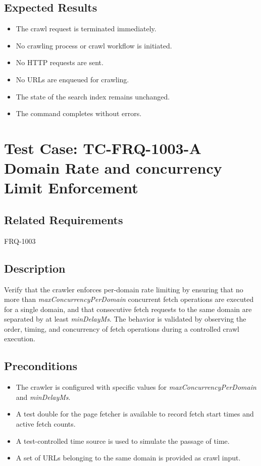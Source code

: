 \documentclass{article}
\begin{document}
\subsection*{Expected Results}
\begin{itemize}
  \item The crawl request is terminated immediately.
  \item No crawling process or crawl workflow is initiated.
  \item No HTTP requests are sent.
  \item No URLs are enqueued for crawling.
  \item The state of the search index remains unchanged.
  \item The command completes without errors.
\end{itemize}


\section{Test Case: TC-FRQ-1003-A \newline Domain Rate and concurrency Limit Enforcement}

\subsection*{Related Requirements}
FRQ-1003

\subsection*{Description}
Verify that the crawler enforces per-domain rate limiting by ensuring that no more than 
\textit{maxConcurrencyPerDomain} concurrent fetch operations are executed for a single domain, 
and that consecutive fetch requests to the same domain are separated by at least 
\textit{minDelayMs}. The behavior is validated by observing the order, timing, and concurrency 
of fetch operations during a controlled crawl execution.


\subsection*{Preconditions}
\begin{itemize}
  \item The crawler is configured with specific values for \textit{maxConcurrencyPerDomain} and \textit{minDelayMs}.
  \item A test double for the page fetcher is available to record fetch start times and active fetch counts.
  \item A test-controlled time source is used to simulate the passage of time.
  \item A set of URLs belonging to the same domain is provided as crawl input.
\end{itemize}
\end{document}
